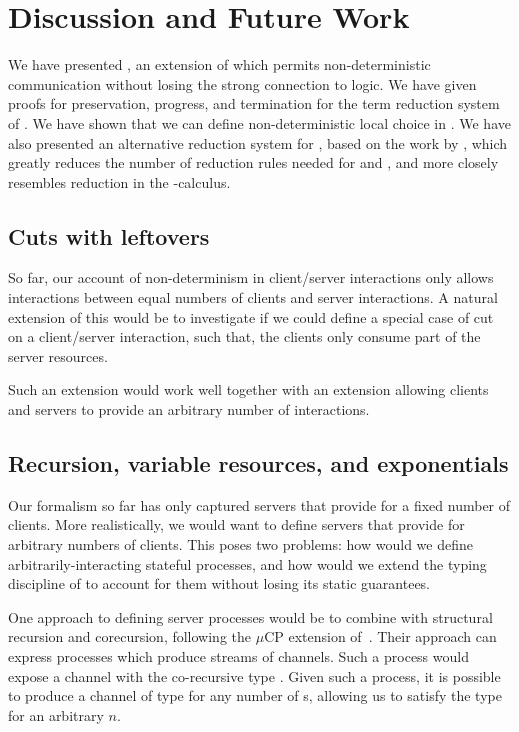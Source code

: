 \documentclass[UKenglish]{llncs}
\begin{document}
\section{Discussion and Future Work}\label{sec:discussion}
We have presented \nodcap, an extension of \cp which permits non-deterministic
communication without losing the strong connection to logic.
We have given proofs for preservation, progress, and termination for the term
reduction system of \nodcap.
We have shown that we can define non-deterministic local choice in \nodcap.
We have also presented an alternative reduction system for \cp, based on the
work by \textcite{lindley2015semantics}, which greatly reduces the number of
reduction rules needed for \cp and \nodcap, and more closely resembles reduction
in the \textpi-calculus.

\subsection{Cuts with leftovers}
So far, our account of non-determinism in client/server interactions only allows
interactions between equal numbers of clients and server interactions. A natural
extension of this would be to investigate if we could define a special case of
cut on a client/server interaction, such that, \eg the clients only consume
part of the server resources.
\begin{prooftree}
\end{prooftree}
Such an extension would work well together with an extension allowing clients
and servers to provide an arbitrary number of interactions.

\subsection{Recursion, variable resources, and exponentials}
Our formalism so far has only captured servers that provide for a fixed number
of clients.  More realistically, we would want to define servers that provide
for arbitrary numbers of clients.  This poses two problems: how would we define
arbitrarily-interacting stateful processes, and how would we extend the
typing discipline of \nodcap to account for them without losing its static
guarantees.

One approach to defining server processes would be to combine \nodcap with
structural recursion and corecursion, following the $\mu\text{CP}$ extension
of~\textcite{lindley2016}.  Their approach can express processes which produce
streams of  channels. Such a process would expose a channel with the
co-recursive type .  Given such a process, it is
possible to produce a channel of type  for
any number of s, allowing us to satisfy the type  for an
arbitrary $n$.
\end{document}
